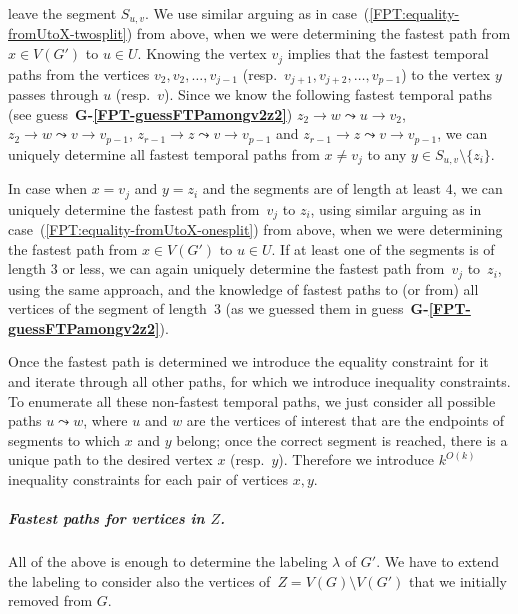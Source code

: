 \documentclass[a4paper,UKenglish,cleveref, autoref, thm-restate]{lipics-v2021}
\begin{document}
\begin{enumerate}[(i)]
leave the segment $S_{u,v}$. 
We use similar arguing as in case~(\ref{FPT:equality-fromUtoX-twosplit}) from above, when we were determining the fastest path from $x \in V(G')$ to $u \in U$.
Knowing the vertex $v_j$
implies that the fastest temporal paths from the vertices $v_2, v_2, \dots, v_{j-1}$ (resp.~$v_{j+1}, v_{j+2}, \dots, v_{p-1}$) to the vertex $y$ passes through $u$ (resp.~$v$).
Since we know the following fastest temporal paths (see guess~\textcolor{lipicsGray}{\textsf{\textbf{G-\ref{FPT-guessFTPamongv2z2}}}}) 
$z_2 \rightarrow w \leadsto u \rightarrow v_2$,
$z_2 \rightarrow w \leadsto v \rightarrow v_{p-1}$,
$z_{r-1} \rightarrow z \leadsto v \rightarrow v_{p-1}$ and
$z_{r-1} \rightarrow z \leadsto v \rightarrow v_{p-1}$,
we can uniquely determine all fastest temporal paths from $x \neq v_j$ to any $y \in S_{u,v} \setminus \{z_i\}$.

In case when $x = v_j$ and $y = z_i$ and the segments are of length at least $4$, we can uniquely determine the fastest path from~$v_j$ to $z_i$,
using 
similar arguing as in case~(\ref{FPT:equality-fromUtoX-onesplit}) from above, when we were determining the fastest path from $x \in V(G')$ to $u \in U$.
If at least one of the segments is of length $3$ or less,
we can again uniquely determine the fastest path from~$v_j$ to~$z_i$, using the same approach, 
and the knowledge of fastest paths to (or from) all vertices of the segment of length~$3$
(as we guessed them in guess~\textcolor{lipicsGray}{\textsf{\textbf{G-\ref{FPT-guessFTPamongv2z2}}}}).
\end{enumerate}
Once the fastest path is determined we introduce the equality constraint for it
and iterate through all other paths, for which we introduce inequality constraints.
To enumerate all these non-fastest temporal paths, we just consider all possible paths $u \leadsto w$, where 
$u$ and $w$ are the vertices of interest that are the endpoints of segments to which $x$ and $y$ belong;
once the correct segment is reached, there is a unique path to the desired vertex $x$ (resp.~$y$). 
Therefore we introduce $k^{O(k)}$ inequality constraints for each pair of vertices $x,y$.

\subparagraph{\boldmath Fastest paths for vertices in $Z$.}
All of the above is enough to determine the labeling $\lambda$ of $G'$. We have to extend the labeling to consider also the vertices of~$Z= V(G) \setminus V(G')$ that we initially removed from $G$.
\end{document}
